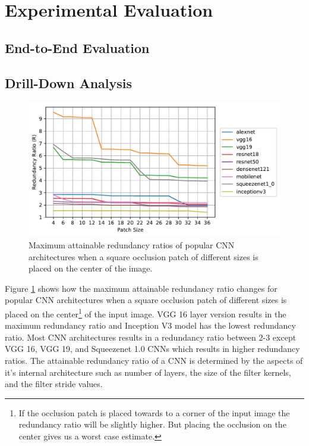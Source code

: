 \section{Experimental Evaluation}

\subsection{End-to-End Evaluation}

\subsection{Drill-Down Analysis}

\begin{figure}[t]
\includegraphics[width=\columnwidth]{images/redundancy_ratio}
\caption{Maximum attainable redundancy ratios of popular CNN architectures when a square occlusion patch of different sizes is placed on the center of the image.}
\label{fig:redundancy_ratio}
\end{figure}

Figure \ref{fig:redundancy_ratio} shows how the maximum attainable redundancy ratio changes for popular CNN architectures when a square occlusion patch of different sizes is placed on the center\footnote{If the occlusion patch is placed towards to a corner of the input image the redundancy ratio will be slightly higher. But placing the occlusion on the center gives us a worst case estimate.} of the input image. VGG 16 layer version results in the maximum redundancy ratio and Inception V3 model has the lowest redundancy ratio. Most CNN architectures results in a redundancy ratio between 2-3 except VGG 16, VGG 19, and Squeezenet 1.0 CNNs which results in higher redundancy ratios. The attainable redundancy ratio of a CNN is determined by the aspects of it's internal architecture such as number of layers, the size of the filter kernels, and the filter stride values.
